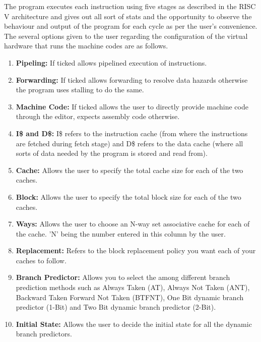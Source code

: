 \documentclass{article}
\begin{document}
The program executes each instruction using five stages as described in the RISC V architecture and gives out all sort of stats and the opportunity to observe the behaviour and output of the program for each cycle as per the user's convenience.\\
\newpage
The several options given to the user regarding the configuration of the virtual hardware that runs the machine codes are as follows.\\
\begin{enumerate}
  \item {\bf Pipeling:} If ticked allows pipelined execution of instructions.
  \item {\bf Forwarding:} If ticked allows forwarding to resolve data hazards otherwise the program uses stalling to do the same.
  \item {\bf Machine Code:} If ticked allows the user to directly provide machine code through the editor, expects assembly code otherwise.
  \item {\bf I\$ and D\$:} I\$ refers to the instruction cache (from where the instructions are fetched during fetch stage) and D\$ refers to the data cache (where all sorts of data needed by the program is stored and read from).
  \item{\bf Cache:} Allows the user to specify the total cache size for each of the two caches.
  \item {\bf Block:} Allows the user to specify the total block size for each of the two caches.
  \item{\bf Ways:} Allows the user to choose an N-way set associative cache for each of the cache. 'N' being the number entered in this column by the user.
  \item{\bf Replacement:} Refers to the block replacement policy you want each of your caches to follow.
  \item{\bf Branch Predictor:} Allows you to select the among different branch prediction methods such as Always Taken (AT), Always Not Taken (ANT), Backward Taken Forward Not Taken (BTFNT), One Bit dynamic branch predictor (1-Bit) and Two Bit dynamic branch predictor (2-Bit).
  \item{\bf Initial State:} Allows the user to decide the initial state for all the dynamic branch predictors.
\end{enumerate}\\
\end{document}
